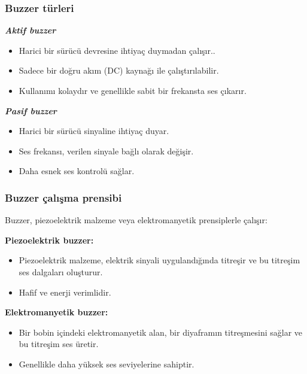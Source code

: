 \subsubsection{Buzzer türleri}
\par\textbf{\textit{Aktif buzzer}}
\begin{itemize}   
\item Harici bir sürücü devresine ihtiyaç duymadan çalışır..
\item Sadece bir doğru akım (DC) kaynağı ile çalıştırılabilir.
\item Kullanımı kolaydır ve genellikle sabit bir frekansta ses çıkarır.
\end{itemize}
\par\textbf{\textit{Pasif buzzer}}
\begin{itemize}   
\item Harici bir sürücü sinyaline ihtiyaç duyar.
\item Ses frekansı, verilen sinyale bağlı olarak değişir.
\item Daha esnek ses kontrolü sağlar.
\end{itemize}

\subsubsection{Buzzer çalışma prensibi}
    Buzzer, piezoelektrik malzeme veya elektromanyetik prensiplerle çalışır:
\par\textbf{Piezoelektrik buzzer:}
\begin{itemize}   
\item Piezoelektrik malzeme, elektrik sinyali uygulandığında titreşir ve bu titreşim ses dalgaları oluşturur.
\item Hafif ve enerji verimlidir.
\end{itemize}
\textbf{Elektromanyetik buzzer:}
\begin{itemize}   
\item Bir bobin içindeki elektromanyetik alan, bir diyaframın titreşmesini sağlar ve bu titreşim ses üretir.
\item Genellikle daha yüksek ses seviyelerine sahiptir.
\end{itemize}
